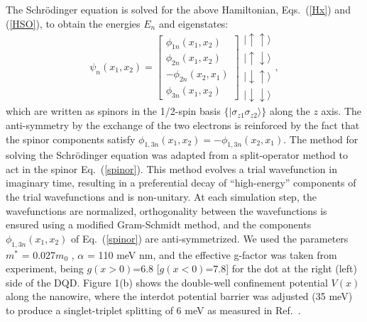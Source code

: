 \documentclass[prb,twocolumn,showpacs,floats]{revtex4}
\begin{document}
The Schr\"odinger equation is solved for the above Hamiltonian, 
Eqs.~(\ref{Hx}) and (\ref{HSO}), to obtain the energies  $E_n$ and eigenstates:
\begin{equation}
\psi_n(x_1,x_2) = 
\begin{bmatrix}
    \phi_{1n}(x_1,x_2)  \\
    \phi_{2n}(x_1,x_2)  \\
     -\phi_{2n}(x_2,x_1)    \\
    \phi_{3n} (x_1,x_2)    
\end{bmatrix}
  \begin{array}{c}
    | \uparrow   \uparrow \rangle \\
    | \uparrow   \downarrow \rangle \\
     |  \downarrow   \uparrow  \rangle \\
    |  \downarrow   \downarrow  \rangle
\end{array},
\label{spinor}
 \end{equation}
 which are written as spinors in the 1/2-spin basis $\{ | \sigma_{z1} \sigma_{z2} \rangle \} $
 along the $z$ axis. The anti-symmetry by the exchange of the 
two electrons is reinforced by the fact that the spinor components satisfy $\phi_{1,3n}(x_1,x_2)=-\phi_{1,3n}(x_2,x_1)$. 
The method for solving the Schr\"odinger equation
was adapted from a split-operator method\cite{deg-review} to act in the spinor
Eq.~(\ref{spinor}). This method evolves a trial wavefunction in imaginary time,
 resulting in a preferential decay of “high-energy” components of the trial wavefunctions and
is non-unitary. At each simulation step, the
wavefunctions are normalized, orthogonality  between  the  wavefunctions is ensured
using a modified Gram-Schmidt method,\cite{deg-review} and the components $\phi_{1,3n}(x_1,x_2) $
of Eq.~(\ref{spinor}) are anti-symmetrized.   
We used the parameters  $m^*$ = 0.027$m_0$ , $\alpha$ = 110 meV nm, and
the effective g-factor was taken from experiment,\cite{petta-prb}
being $g(x>0)$=6.8 [$g(x<0)$=7.8] for the dot at the right (left) side of the DQD.
Figure 1(b) shows the double-well confinement potential $V(x)$ along the nanowire, 
where the interdot potential barrier was adjusted\cite{comment-triplet20} (35 meV) 
to produce a singlet-triplet splitting of 6 meV as measured in Ref.~.
\end{document}
